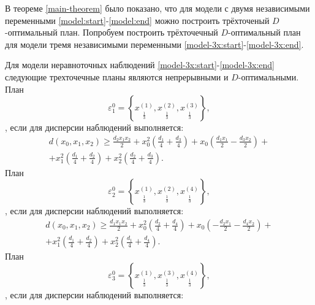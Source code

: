 В теореме \ref{main-theorem} было показано, что для модели с двумя независимыми переменными \eqref{model:start}-\eqref{model:end} можно построить трёхточеный $D$-оптимальный план.  
Попробуем построить трёхточечный $D$-оптимальный план для модели тремя независимыми переменными  \eqref{model-3x:start}-\eqref{model-3x:end}.
\begin{theorem}\label{theorem:model-3x-D-opt}
	Для модели неравноточных наблюдений \eqref{model-3x:start}-\eqref{model-3x:end} следующие трехточечные планы являются непрерывными и $D$-оптимальными.\\
	План 
	\begin{equation} \label{theorem:model-3x-D-opt:plan-1}
	\varepsilon_1^{0} = \left \{ 
	\underset{\frac 1 3} {x^{(1)}},
	\underset{\frac 1 3} {x^{(2)}},
	\underset{\frac 1 3} {x^{(3)}}
	\right \},
	\end{equation},
	если для дисперсии наблюдений выполняется:
	\begin{multline}\label{theorem:model-3x-D-opt:plan-1-d}
	d(x_0, x_1, x_2) \ge \frac{d_{2} x_{1} x_{2}}{2} + x_{0}^{2} \left(\frac{d_{1}}{4} + \frac{d_{3}}{4}\right) + x_{0} \left(\frac{d_{1} x_{1}}{2} - \frac{d_{3} x_{2}}{2}\right) + \\ + x_{1}^{2} \left(\frac{d_{1}}{4} + \frac{d_{2}}{4}\right) + x_{2}^{2} \left(\frac{d_{2}}{4} + \frac{d_{3}}{4}\right).
	\end{multline}
	План 
	\begin{equation} \label{theorem:model-3x-D-opt:plan-2}
	\varepsilon_2^{0} = \left \{ 
	\underset{\frac 1 3} {x^{(1)}},
	\underset{\frac 1 3} {x^{(2)}},
	\underset{\frac 1 3} {x^{(4)}}
	\right \},
	\end{equation},
	если для дисперсии наблюдений выполняется:
	\begin{multline}\label{theorem:model-3x-D-opt:plan-2-d}
	d(x_0, x_1, x_2) \ge \frac{d_{1} x_{1} x_{2}}{2} + x_{0}^{2} \left(\frac{d_{2}}{4} + \frac{d_{4}}{4}\right) + x_{0} \left(- \frac{d_{2} x_{1}}{2} - \frac{d_{4} x_{2}}{2}\right) + \\ + x_{1}^{2} \left(\frac{d_{1}}{4} + \frac{d_{2}}{4}\right) + x_{2}^{2} \left(\frac{d_{1}}{4} + \frac{d_{4}}{4}\right).
	\end{multline}
	План 
	\begin{equation} \label{theorem:model-3x-D-opt:plan-3}
	\varepsilon_3^{0} = \left \{ 
	\underset{\frac 1 3} {x^{(1)}},
	\underset{\frac 1 3} {x^{(3)}},
	\underset{\frac 1 3} {x^{(4)}}
	\right \},
	\end{equation},
	если для дисперсии наблюдений выполняется:

\end{theorem}
